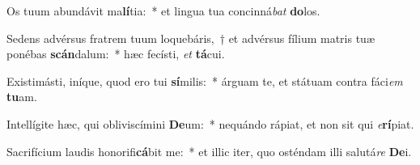 \item Os tuum abundávit ma\textbf{lí}tia:~* et lingua tua concinná\textit{bat} \textbf{do}los.
\item Sedens advérsus fratrem tuum loquebáris,~† et advérsus fílium matris tuæ ponébas \textbf{scán}dalum:~* hæc fecísti, \textit{et} \textbf{tá}cui.
\item Existimásti, iníque, quod ero tui \textbf{sí}milis:~* árguam te, et státuam contra fáci\textit{em} \textbf{tu}am.
\item Intellígite hæc, qui obliviscímini \textbf{De}um:~* nequándo rápiat, et non sit qui \textit{e}\textbf{rí}piat.
\item Sacrifícium laudis honorifi\textbf{cá}bit me:~* et illic iter, quo osténdam illi salutá\textit{re} \textbf{De}i.
